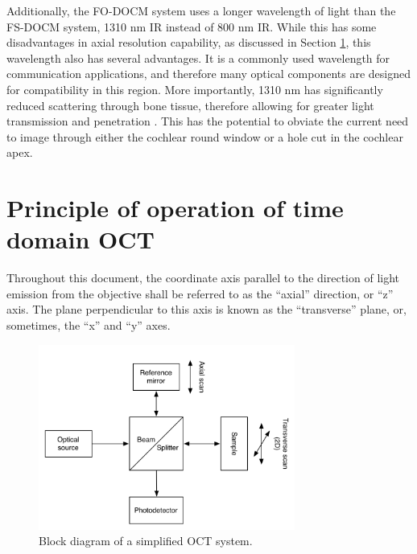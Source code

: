 Additionally, the FO-DOCM system uses a longer wavelength of light than the FS-DOCM system, 1310 nm IR instead of 800 nm IR. While this has some disadvantages in axial resolution capability, as discussed in Section \ref{sec:principles_oct}, this wavelength also has several advantages. It is a commonly used wavelength for communication applications, and therefore many optical components are designed for compatibility in this region. More importantly, 1310 nm has significantly reduced scattering through bone tissue, therefore allowing for greater light transmission and penetration \cite{Sandell2011} \cite{Bashkatov2006}. This has the potential to obviate the current need to image through either the cochlear round window or a hole cut in the cochlear apex.

\section{Principle of operation of time domain OCT}
\label{sec:principles_oct}


Throughout this document, the coordinate axis parallel to the direction of light emission from the objective shall be referred to as the ``axial'' direction, or ``z'' axis. The plane perpendicular to this axis is known as the ``transverse'' plane, or, sometimes, the ``x'' and ``y'' axes. %

\begin{figure}[h!]
  \centering
    \includegraphics[width=0.75\textwidth]{Images/Background/basic_oct_2.png}
      \caption{Block diagram of a simplified OCT system.\label{fig:basic_oct}}
\end{figure}

